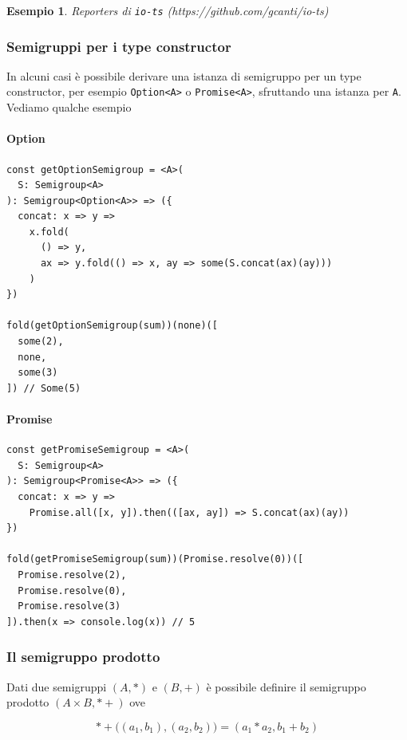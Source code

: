 \documentclass[12pt]{article}
\newtheorem{example}{Esempio}
\begin{document}
\begin{example}
Reporters di \texttt{io-ts} (https://github.com/gcanti/io-ts)
\end{example}

\subsubsection{Semigruppi per i type constructor}

In alcuni casi è possibile derivare una istanza di semigruppo per un type constructor, per esempio \texttt{Option<A>} o \texttt{Promise<A>},
sfruttando una istanza per \texttt{A}. Vediamo qualche esempio

\paragraph{Option}

\begin{verbatim}
const getOptionSemigroup = <A>(
  S: Semigroup<A>
): Semigroup<Option<A>> => ({
  concat: x => y =>
    x.fold(
      () => y,
      ax => y.fold(() => x, ay => some(S.concat(ax)(ay)))
    )
})

fold(getOptionSemigroup(sum))(none)([
  some(2),
  none,
  some(3)
]) // Some(5)
\end{verbatim}

\paragraph{Promise}

\begin{verbatim}
const getPromiseSemigroup = <A>(
  S: Semigroup<A>
): Semigroup<Promise<A>> => ({
  concat: x => y =>
    Promise.all([x, y]).then(([ax, ay]) => S.concat(ax)(ay))
})

fold(getPromiseSemigroup(sum))(Promise.resolve(0))([
  Promise.resolve(2),
  Promise.resolve(0),
  Promise.resolve(3)
]).then(x => console.log(x)) // 5
\end{verbatim}

\subsubsection{Il semigruppo prodotto}

Dati due semigruppi $(A, *)$ e $(B, +)$ è possibile definire il semigruppo prodotto $(A \times B, *+)$ ove

$$
*+\Big((a_1, b_1), (a_2, b_2)\Big) = (a_1 * a_2, b_1 + b_2)
$$
\end{document}

